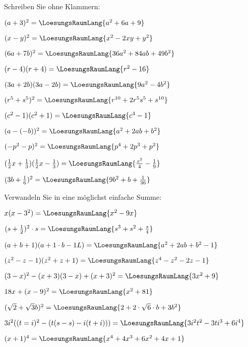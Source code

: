 
\renewcommand{\bbwAufgabenBlockID}{A1Bi}

\renewcommand{\metaHeaderLine}{Aufgabenblatt}
\renewcommand{\arbeitsblattTitel}{Binomische Formeln}


\arbeitsblattHeader{}

Schreiben Sie ohne Klammern:

\begin{bbwAufgabenBlock}
\item $(a+3)^2 = \LoesungsRaumLang{a^2+6a+9}$
\item $(x-y)^2 = \LoesungsRaumLang{x^2-2xy+y^2}$
\item $(6a+7b)^2 = \LoesungsRaumLang{36a^2+84ab+49b^2}$
\item $(r-4)(r+4) = \LoesungsRaumLang{r^2-16}$
\item $(3a+2b)(3a-2b) = \LoesungsRaumLang{9a^2-4b^2}$
\item $(r^5 + s^5)^2 = \LoesungsRaumLang{r^{10} + 2r^5s^5+s^{10}}$
\item $(c^2-1)(c^2+1) = \LoesungsRaumLang{c^4-1}$
\item $(a-(-b))^2 = \LoesungsRaumLang{a^2+2ab+b^2}$
\item $(-p^2-p)^2 = \LoesungsRaumLang{p^4+2p^3+p^2}$
\item $(\frac12x+\frac13)(\frac12x-\frac13)= \LoesungsRaumLang{\frac{x^2}4 - \frac19}$
\item $(3b+\frac16)^2 = \LoesungsRaumLang{9b^2+b+\frac1{36}}$
\end{bbwAufgabenBlock}

\platzFuerBerechnungenBisEndeSeite{}

Verwandeln Sie in eine möglichst einfache Summe:

\begin{bbwAufgabenBlock}
\item $x(x-3^2) = \LoesungsRaumLang{x^2-9x}$
\item $(s+\frac12)^2\cdot{}s = \LoesungsRaumLang{s^3+s^2+\frac{s}4}$
\item $(a+b+1)(a+1\cdot{}b-1L) = \LoesungsRaumLang{a^2+2ab+b^2 - 1}$
\item $(z^2-z-1)(z^2+z+1) = \LoesungsRaumLang{z^4-z^2-2z-1}$
\item $(3-x)^2 - (x+3)(3-x)+(x+3)^2 = \LoesungsRaumLang{3x^2+9}$
\item $18x + (x-9)^2 = \LoesungsRaumLang{x^2 + 81}$
\item $(\sqrt{2} + \sqrt{3}b)^2 = \LoesungsRaumLang{2 +2\cdot{}\sqrt{6}\cdot{}b+3b^2}$
\item $3i^2((t=i)^2-(t(s-s)-i(t+i))) = \LoesungsRaumLang{3i^2t^2 - 3ti^3 + 6i^4}$
\item $(x+1)^4 = \LoesungsRaumLang{x^4+4x^3+6x^2+4x+1}$
\end{bbwAufgabenBlock}

\platzFuerBerechnungenBisEndeSeite{}


